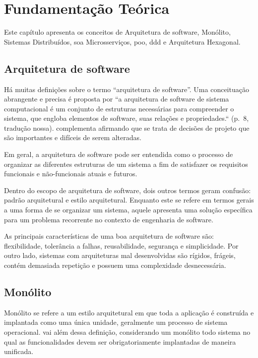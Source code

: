 \chapter{Fundamentação Teórica}
\label{cap:fundamentacao}

Este capítulo apresenta os conceitos de Arquitetura de software, Monólito, Sistemas Distribuídos, \acrfull{soa} Microsserviços, \acrfull{poo}, \acrfull{ddd} e Arquitetura Hexagonal.

\section{Arquitetura de software}

Há muitas definições sobre o termo “arquitetura de software”. Uma conceituação abrangente e precisa é proposta por  ``a arquitetura de software de sistema computacional é um conjunto de estruturas necessárias para compreender o sistema, que engloba elementos de software, suas relações e propriedades.`` (p.~8, tradução nossa).  complementa afirmando que se trata de decisões de projeto que são importantes e difíceis de serem alteradas.

Em geral, a arquitetura de software pode ser entendida como o processo de organizar as diferentes estruturas de um sistema a fim de satisfazer os requisitos funcionais e não-funcionais atuais e futuros. 

Dentro do escopo de arquitetura de software, dois outros termos geram confusão: padrão arquitetural e estilo arquitetural. Enquanto este se refere em termos gerais a uma forma de se organizar um sistema, aquele apresenta uma solução específica para um problema recorrente no contexto de engenharia de software. 

As principais características de uma boa arquitetura de software são: flexibilidade, tolerância a falhas, reusabilidade, segurança e simplicidade. Por outro lado, sistemas com arquiteturas mal desenvolvidas são rígidos, frágeis, contém demasiada repetição e possuem uma complexidade desnecessária.

\section{Monólito} 
Monólito se refere a um estilo arquitetural em que toda a aplicação é construída e implantada como uma única unidade, geralmente um processo de sistema operacional.  vai além dessa definição, considerando um monólito todo sistema no qual as funcionalidades devem ser obrigatoriamente implantadas de maneira unificada.

